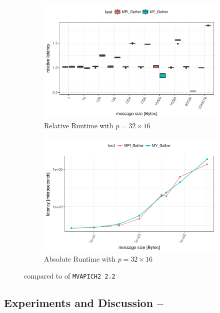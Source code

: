 \begin{figure}[h]
    \begin{subfigure}[b]{0.49\textwidth}
        \includegraphics[width=\textwidth]{../benchmarks/mpich/binom/gather_32/rel_runtime.pdf}
        \caption{Relative Runtime with $p=32 \times 16$}
        \label{fig:Gather:MPICH:Rel:32}
    \end{subfigure}
    \begin{subfigure}[b]{0.49\textwidth}
        \includegraphics[width=\textwidth]{../benchmarks/mpich/binom/gather_32/runtime.pdf}
        \caption{Absolute Runtime with $p=32 \times 16$}
        \label{fig:Gather:MPICH:Abs:32}
    \end{subfigure}
    
    \caption{\mygather compared to \mpigather of \texttt{MVAPICH2 2.2}}
\end{figure}

\subsection{Experiments and Discussion -- \myscatter}

